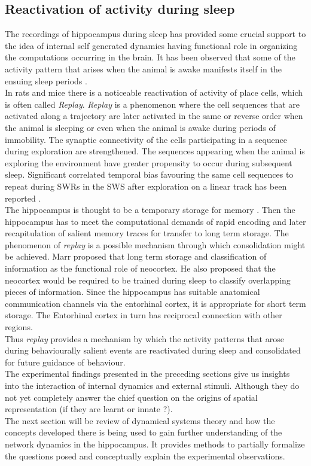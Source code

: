 \subsection{Reactivation of activity during sleep}
\label{replay}
The recordings of hippocampus during sleep has provided some crucial support to the idea of internal self generated dynamics having functional role in organizing the computations occurring in the brain. It has been observed that some of the activity pattern that arises when the animal is awake manifests itself in the ensuing sleep periods \cite{Wilson1994}. \\
In rats and mice there is a noticeable reactivation of activity of place cells, which is often called \emph{Replay}. \emph{Replay} is a phenomenon where the cell sequences that are activated along a trajectory are later activated in the same or reverse order when the animal is sleeping or even when the animal is awake during periods of immobility. The synaptic connectivity of the cells participating in a sequence during exploration are strengthened.  The sequences appearing when the animal is exploring the environment have greater propensity to occur during subsequent sleep. Significant correlated temporal bias favouring the same cell sequences to repeat during SWRs in the SWS after exploration on a linear track has been reported \cite{Skaggs1996b}. \\
The hippocampus is thought to be a temporary storage for memory \cite{Buzsaki1989, Battaglia2011}. Then the hippocampus has to meet the computational demands of rapid encoding and later recapitulation of salient memory traces for transfer to long term storage. The phenomenon of \emph{replay} is a possible mechanism through which consolidation might be achieved.  Marr \cite{Marr2007} proposed that long term storage and classification of information as the functional role of neocortex. He also proposed that the neocortex would be required to be trained during sleep to classify overlapping pieces of information. Since the hippocampus has suitable anatomical communication channels via the entorhinal cortex, it is appropriate for short term storage. The Entorhinal cortex in turn has reciprocal connection with other regions. \\

Thus \emph{replay} provides a mechanism by which the activity patterns that arose during behaviourally salient events are reactivated during sleep and consolidated for future guidance of behaviour. \\


The experimental findings presented in the preceding sections give us insights into the interaction of internal dynamics and external stimuli. Although they do not yet completely answer the chief question on the origins of spatial representation (if they are learnt or innate ?). \\
The next section will be review of dynamical systems theory and how the concepts developed there is being used to gain further understanding of the network dynamics in the hippocampus. It provides methods to partially formalize the questions posed and conceptually explain the experimental observations. 






